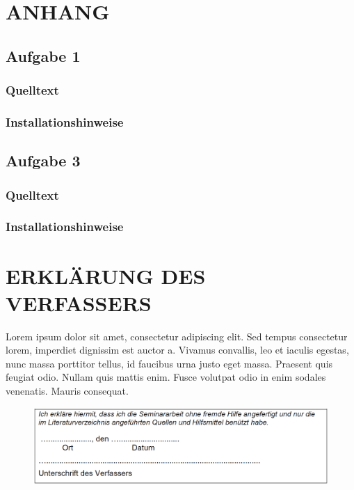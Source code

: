 \documentclass[a4paper,12pt]{article}
\begin{document}
\newpage
\section{ANHANG}
\subsection{Aufgabe 1}
\subsubsection{Quelltext}
\subsubsection{Installationshinweise}

\subsection{Aufgabe 3}
\subsubsection{Quelltext}
\subsubsection{Installationshinweise}


\newpage
\section{ERKLÄRUNG DES VERFASSERS}



Lorem ipsum dolor sit amet, consectetur adipiscing elit. Sed tempus consectetur lorem, imperdiet dignissim est auctor a. Vivamus convallis, leo et iaculis egestas, nunc massa porttitor tellus, id faucibus urna justo eget massa. Praesent quis feugiat odio. Nullam quis mattis enim. Fusce volutpat odio in enim sodales venenatis. Mauris consequat.

\begin{figure}[H]
    \includegraphics[width=\linewidth]{Bilder/Sonstiges/ErklaerungDesVerfassers.png}
\end{figure}
\end{document}
